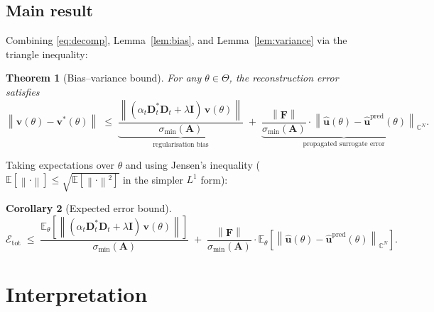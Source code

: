 \documentclass[11pt, a4paper]{article}
\newtheorem{theorem}{Theorem}[section]
\newtheorem{corollary}[theorem]{Corollary}
\newcommand{\C}{\mathbb{C}}
\newcommand{\E}{\mathbb{E}}
\newcommand{\norm}[1]{\left\|#1\right\|}
\begin{document}
\subsection{Main result}

Combining \eqref{eq:decomp}, Lemma~\ref{lem:bias}, and Lemma~\ref{lem:variance}
via the triangle inequality:

\begin{theorem}[Bias--variance bound]
  \label{thm:bv}
  For any $\theta \in \Theta$, the reconstruction error satisfies
  \begin{equation}
    \label{eq:bv_bound}
    \norm{\mathbf{v}(\theta) - \mathbf{v}^*(\theta)}
    \;\leq\;
    \underbrace{
      \frac{\norm{(\alpha_t\mathbf{D}_t^*\mathbf{D}_t + \lambda\mathbf{I})\,\mathbf{v}(\theta)}}
           {\sigma_{\min}(\mathbf{A})}
    }_{\text{regularisation bias}}
    \;+\;
    \underbrace{
      \frac{\norm{\mathbf{F}}}{\sigma_{\min}(\mathbf{A})}
      \cdot
      \norm{\hat{\mathbf{u}}(\theta) - \hat{\mathbf{u}}^{\mathrm{pred}}(\theta)}_{\C^N}
    }_{\text{propagated surrogate error}}.
  \end{equation}
\end{theorem}

Taking expectations over $\theta$ and using Jensen's inequality
($\E[\norm{\cdot}] \leq \sqrt{\E[\norm{\cdot}^2]}$ in the simpler
$L^1$ form):

\begin{corollary}[Expected error bound]
  \label{cor:expected}
  \begin{equation}
    \label{eq:expected_bv}
    \mathcal{E}_{\mathrm{tot}}
    \;\leq\;
    \frac{\E_\theta\!\left[\norm{(\alpha_t\mathbf{D}_t^*\mathbf{D}_t
                                  + \lambda\mathbf{I})\,\mathbf{v}(\theta)}\right]}
         {\sigma_{\min}(\mathbf{A})}
    \;+\;
    \frac{\norm{\mathbf{F}}}{\sigma_{\min}(\mathbf{A})}
    \cdot
    \E_\theta\!\left[\norm{\hat{\mathbf{u}}(\theta)
                           - \hat{\mathbf{u}}^{\mathrm{pred}}(\theta)}_{\C^N}\right].
  \end{equation}
\end{corollary}

\section{Interpretation}
\end{document}
